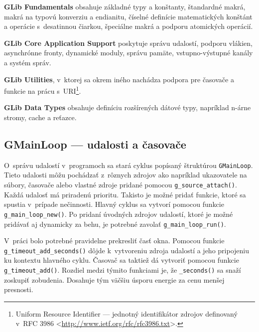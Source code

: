\documentclass[12pt,oneside,final]{fithesis2}
\begin{document}
\textbf{GLib Fundamentals} obsahuje základné typy a konštanty, štandardné makrá, makrá na typovú konverziu a endianitu, číselné definície matematických konštánt a operácie s~desatinnou čiarkou, špeciálne makrá a podporu atomických operácií.

\textbf{GLib Core Application Support} poskytuje správu udalostí, podporu vlákien, asynchrónne fronty, dynamické moduly, správu pamäte, vstupno-výstupné kanály a systém správ.
 
\textbf{GLib Utilities}, v~ktorej sa okrem iného nachádza podpora pre časovače a funkcie na prácu s~URI\footnote{Uniform Resource Identifier --- jednotný identifikátor zdrojov definovaný v~RFC 3986 <\url{http://www.ietf.org/rfc/rfc3986.txt}>.}.

\textbf{GLib Data Types} obsahuje definíciu rozšírených dátové typy, napríklad n-árne stromy, cache a reťazce.

\subsection{GMainLoop --- udalosti a časovače}
O~správu udalostí v~programoch sa stará cyklus popísaný štruktúrou \texttt{GMainLoop}. Tieto udalosti môžu pochádzať z~rôznych zdrojov ako napríklad ukazovatele na súbory, časovače alebo vlastné zdroje pridané pomocou \texttt{g\_\-source}\texttt{\_\-attach()}. Každá udalosť má priradenú prioritu. Takisto je možné pridať funkcie, ktoré sa spustia v~prípade nečinnosti. Hlavný cyklus sa vytvorí pomocou funkcie \texttt{g\_\-main\_\-loop\_\-new()}. Po pridaní úvodných zdrojov udalostí, ktoré je možné pridávať aj dynamicky za behu, je potrebné zavolať \texttt{g\_\-main\_\-loop\_\-run()}.

V~práci bolo potrebné pravidelne prekresliť časť okna. Pomocou funkcie \texttt{g\_\-timeout\_\-add\_\-seconds()} dôjde k~vytvoreniu zdroja udalostí a jeho pripojeniu ku kontextu hlavného cyklu. Časovač sa taktiež dá vytvoriť pomocou funkcie \texttt{g\_\-timeout\_\-add()}. Rozdiel medzi týmito funkciami je, že \texttt{\_\-seconds()} sa snaží zoskupiť zobudenia. Dosahuje tým väčšiu úsporu energie za cenu menšej presnosti.
\end{document}
